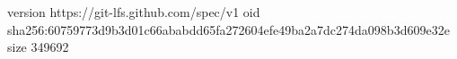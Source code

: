 version https://git-lfs.github.com/spec/v1
oid sha256:60759773d9b3d01c66ababdd65fa272604efe49ba2a7dc274da098b3d609e32e
size 349692
